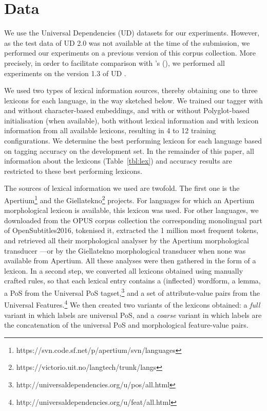 \documentclass[11pt,letterpaper]{article}
\begin{document}

\section{Data}

We use the Universal Dependencies (UD) datasets for our experiments. However, as the test data of UD 2.0 was not
available at the time of the submission, we performed our experiments on a previous version of this corpus
collection. More precisely, in order to facilitate comparison with \citeauthor{plank16}'s (\citeyear{plank16}), we
performed all experiments on the version 1.3 of UD \cite{ud13}.

We used two types of lexical information sources, thereby obtaining one to three lexicons for each language, in the way
sketched below. We trained our tagger with and without character-based embeddings, and with or without Polyglot-based
initialisation (when available), both without lexical information and with lexicon information from all available
lexicons, resulting in 4 to 12 training configurations. We determine the best performing lexicon for each language based
on tagging accuracy on the development set. In the remainder of this paper, all information about the lexicons
(Table~\ref{tbl:lex}) and accuracy results are restricted to these best performing lexicons.

The sources of lexical information we used are twofold. The first one is the
Apertium\footnote{https://svn.code.sf.net/p/apertium/svn/languages} and the
Giellatekno\footnote{https://victorio.uit.no/langtech/trunk/langs} projects. For languages for which an Apertium
morphological lexicon is available, this lexicon was used. For other languages, we downloaded from the OPUS corpus
collection the corresponding monolingual part of OpenSubtitles2016, tokenised it, extracted the 1 million most frequent
tokens, and retrieved all their morphological analyser by the Apertium morphological transducer ---or by the Giellatekno
morphological transducer when none was available from Apertium. All these analyses were then gathered in the form of a
lexicon. In a second step, we converted all lexicons obtained using manually crafted rules, so that each lexical entry
contains a (inflected) wordform, a lemma, a PoS from the Universal PoS
tagset,\footnote{http://universaldependencies.org/u/pos/all.html} and a set of attribute-value pairs from the Universal
Features.\footnote{http://universaldependencies.org/u/feat/all.html} We then created two variants of the lexicons
obtained: a {\em full} variant in which labels are universal PoS, and a {\em coarse} variant in which labels are the
concatenation of the universal PoS and morphological feature-value pairs.
\end{document}
